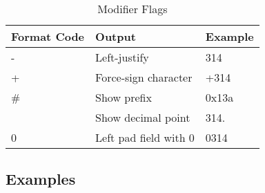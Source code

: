 \begin{table}[h]
    \caption{Modifier Flags \cite{cplusplus}}
    \begin{tabularx}{\textwidth}{|l|X|l|} \hline
        Format Code &   Output                  &   Example    \\ \hline
        -           &   Left-justify            &   314        \\
        +           &   Force-sign character    &   +314       \\
        \#          &   Show prefix             &   0x13a      \\
                    &   Show decimal point      &   314.       \\
        0           &   Left pad field with 0   &   0314       \\
        \hline
    \end{tabularx}
\end{table}

\subsection{Examples}

